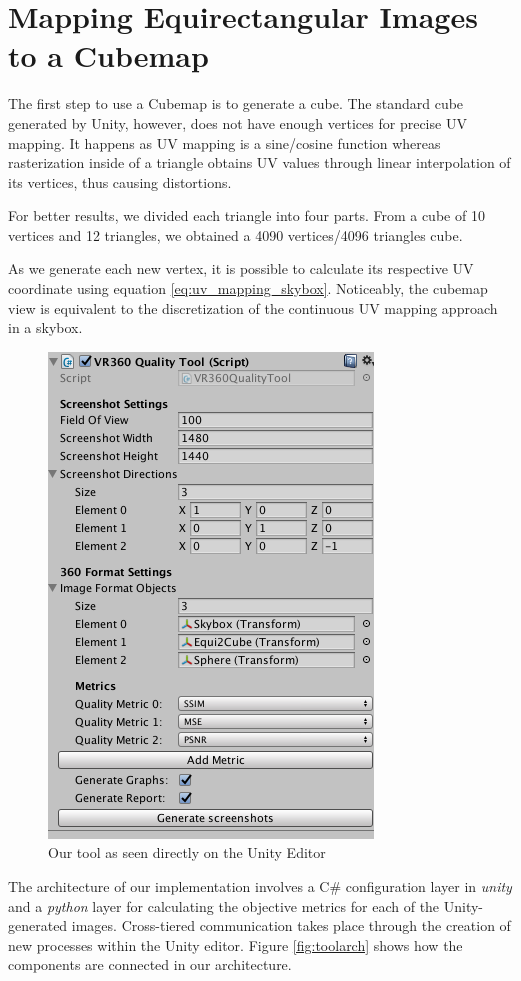 \documentclass[12pt]{article}
\begin{document}
\section{Mapping Equirectangular Images to a Cubemap}
The first step to use a Cubemap is to generate a cube. The standard cube generated by Unity, however, does not have enough vertices for precise UV mapping. It happens as UV mapping is a sine/cosine function whereas rasterization inside of a triangle obtains UV values through linear interpolation of its vertices, thus causing distortions.

For better results, we divided each triangle into four parts. From a cube of 10 vertices and 12 triangles, we obtained a 4090 vertices/4096 triangles cube.

As we generate each new vertex, it is possible to calculate its respective UV coordinate using equation \ref{eq:uv_mapping_skybox}. Noticeably, the cubemap view is equivalent to the discretization of the continuous UV mapping approach in a skybox.

\begin{figure}
    \centering
    \includegraphics{images/tool.png}
    \caption{Our tool as seen directly on the Unity Editor}
    \label{fig:tool}
\end{figure}

The architecture of our implementation involves a C\# configuration layer in \textit{unity} and a \textit{python} layer for calculating the objective metrics for each of the Unity-generated images. Cross-tiered communication takes place through the creation of new processes within the Unity editor. Figure \ref{fig:toolarch} shows how the components are connected in our architecture.
\end{document}
